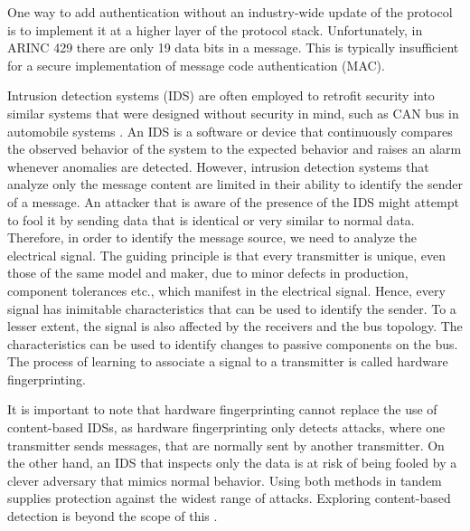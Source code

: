 \documentclass[compsoc,conference,a4paper]{IEEEtran}
\newcommand{\sublevel}[1]{\subsection{#1}}
\newcommand{\sublevel}[1]{\section{#1}}
\begin{document}
  One way to add authentication without an industry-wide update of the protocol is to implement it at a higher layer of the protocol stack. Unfortunately, in ARINC 429 there are only 19 data bits in a message. This is typically insufficient for a secure implementation of message code authentication (MAC).
  
  Intrusion detection systems (IDS) are often employed to retrofit security into similar systems that were designed without security in mind, such as CAN bus in automobile systems \cite{muter2011entropy}. An IDS is a software or device that continuously compares the observed behavior of the system to the expected behavior and raises an alarm whenever anomalies are detected. However, intrusion detection systems that analyze only the message content are limited in their ability to identify the sender of a message.  An attacker that is aware of the presence of the IDS might attempt to fool it by sending data that is identical or very similar to normal data.  Therefore, in order to identify the message source, we need to analyze the electrical signal. The guiding principle is that every transmitter is unique, even those of the same model and maker, due to minor defects in production, component tolerances etc., which manifest in the electrical signal. Hence, every signal has inimitable characteristics that can be used to identify the sender. To a lesser extent, the signal is also affected by the receivers and the bus topology. The characteristics can be used to identify changes to passive components on the bus. The process of learning to associate a signal to a transmitter is called hardware fingerprinting.
  
  It is important to note that hardware fingerprinting cannot replace the use of content-based IDSs, as hardware fingerprinting only detects attacks, where one transmitter sends messages, that are normally sent by another transmitter. On the other hand, an IDS that inspects only the data is at risk of being fooled by a clever adversary that mimics normal behavior. Using both methods in tandem supplies protection against the widest range of attacks. Exploring content-based detection is beyond the scope of this \iftoggle{paper} {paper} {work}.
  
\end{document}
